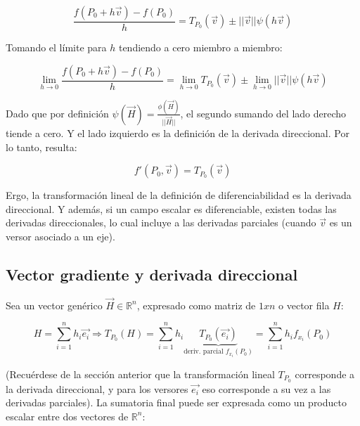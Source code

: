 \documentclass{article}
\renewcommand{\Bbb}{\mathbb}
\begin{document}
\begin{equation}
\frac{f(P_0 + h\overrightarrow{v})-f(P_0)}{h} = T_{P_0}(\overrightarrow{v}) \pm ||\overrightarrow{v}|| \psi(h \overrightarrow{v})
\end{equation}

Tomando el límite para $h$ tendiendo a cero miembro a miembro:

\begin{equation}
\lim_{h \rightarrow 0} \frac{f(P_0 + h\overrightarrow{v})-f(P_0)}{h} = \lim_{h \rightarrow 0} T_{P_0}(\overrightarrow{v}) \pm \lim_{h \rightarrow 0} ||\overrightarrow{v}|| \psi(h \overrightarrow{v}) 
\end{equation}

Dado que por definición $\psi(\overrightarrow{H}) = \frac{\phi(\overrightarrow{H})}{||\overrightarrow{H}||}$, el segundo sumando del lado derecho tiende a cero. Y el lado izquierdo es la definición de la derivada direccional. Por lo tanto, resulta:

\begin{equation}
f'(P_0, \overrightarrow{v}) = T_{P_0}(\overrightarrow{v})
\end{equation}

Ergo, la transformación lineal de la definición de diferenciabilidad es la derivada direccional. Y además, si un campo escalar es diferenciable, existen todas las derivadas direccionales, lo cual incluye a las derivadas parciales (cuando $\overrightarrow{v}$ es un versor asociado a un eje).

\subsection{Vector gradiente y derivada direccional}

Sea un vector genérico $\overrightarrow{H} \in \Bbb R^n$, expresado como matriz de $1xn$ o vector fila $H$:

\begin{equation}
H = \sum\limits_{i=1}^{n} {h_i \overrightarrow{e_i}} \Rightarrow T_{P_0}(H) = \sum\limits_{i=1}^{n}{ h_i \underbrace{T_{P_0}(\overrightarrow{e_i})}_{\text{deriv. parcial } f_{x_i}(P_0)} } = \sum\limits_{i=1}^{n}{ h_i f_{x_i}(P_0) }
\end{equation}

(Recuérdese de la sección anterior que la transformación lineal $T_{P_0}$ corresponde a la derivada direccional, y para los versores $\overrightarrow{e_i}$ eso corresponde a su vez a las derivadas parciales). La sumatoria final puede ser expresada como un producto escalar entre dos vectores de $\Bbb R^n$:
\end{document}
